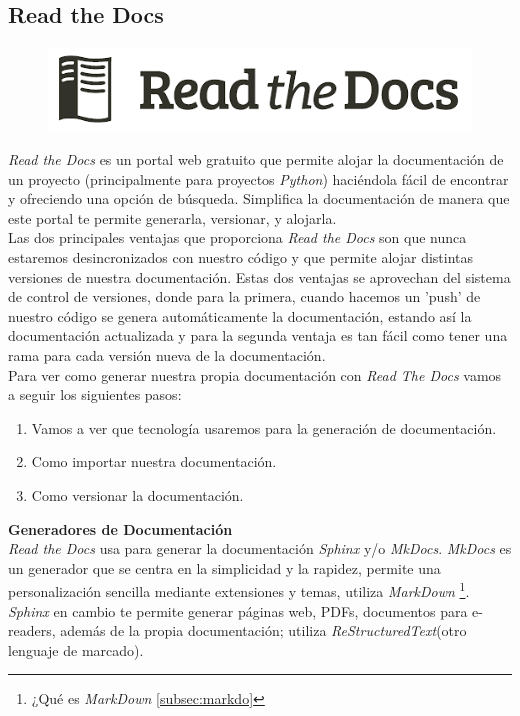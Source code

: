 \documentclass[a4paper, 12pt]{book}
\begin{document}
\subsection{Read the Docs}
\label{subsec:readthedocs}
\begin{figure}[h]
    \centering
    \includegraphics[scale=0.6]{img/logo_readthedocs.png}
    \label{fig:logoReadThe}
\end{figure}
\emph{Read the Docs} es un portal web gratuito que permite alojar la documentación de un proyecto (principalmente para proyectos \emph{Python}) haciéndola fácil de encontrar y ofreciendo una opción de búsqueda. Simplifica la documentación de manera que este portal te permite generarla, versionar, y alojarla.\\
Las dos principales ventajas que proporciona \emph{Read the Docs} son que nunca estaremos desincronizados con nuestro código y que permite alojar distintas versiones de nuestra documentación. Estas dos ventajas se aprovechan del sistema de control de versiones, donde para la primera, cuando hacemos un 'push' de nuestro código se genera automáticamente la documentación, estando así la documentación actualizada y para la segunda ventaja es tan fácil como tener una rama para cada versión nueva de la documentación. \\
Para ver como generar nuestra propia documentación con \emph{Read The Docs} vamos a seguir los siguientes pasos:
\begin{enumerate}
    \item Vamos a ver que tecnología usaremos para la generación de documentación.
    \item Como importar nuestra documentación.
    \item Como versionar la documentación. 
\end{enumerate}
\textbf{Generadores de Documentación} \\
\emph{Read the Docs} usa para generar la documentación \emph{Sphinx} y/o \emph{MkDocs}. \emph{MkDocs} es un generador que se centra en la simplicidad y la rapidez, permite una personalización  sencilla mediante extensiones y temas, utiliza  \emph{MarkDown} \footnote{¿Qué es \emph{MarkDown} \ref{subsec:markdo}}. \emph{Sphinx} en cambio te permite generar páginas web, PDFs, documentos para e-readers, además de la propia documentación; utiliza \emph{ReStructuredText}(otro lenguaje de marcado).\\
\end{document}
